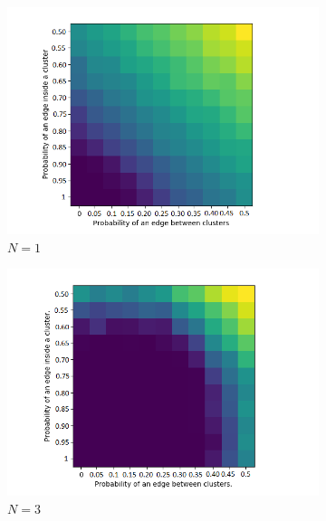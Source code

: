 \documentclass[12pt]{amsart}
\theoremstyle{remark}
\begin{document}
\begin{figure}
     \centering
     \begin{subfigure}[b]{0.5\textwidth}
         \centering
         \includegraphics[width=\textwidth]{./Pictures/Variapq1.PNG}
         \caption{$N=1$}
     \end{subfigure}
     \hfill
     \begin{subfigure}[b]{0.5\textwidth}
         \centering
         \includegraphics[width=\textwidth]{./Pictures/Variapq3.PNG}
         \caption{$N=3$}
     \end{subfigure}
     \hfill
     \begin{subfigure}[b]{0.5\textwidth}
         \centering

\end{subfigure}
\end{figure}
\end{document}
